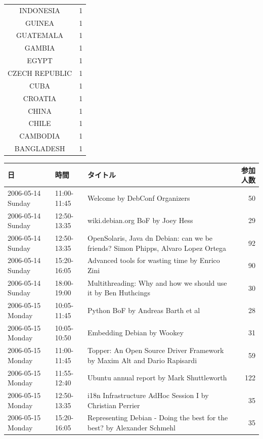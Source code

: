 \documentclass[mingoth,a4paper]{jsarticle}
\begin{document}
\begin{minipage}[t]{0.3\hsize}
{\begin{center}
\begin{tabular}[t]{@{\vrule width 1pt}c|r@{\ \vrule width 1pt}}
 INDONESIA & 1 \\
 GUINEA & 1 \\
 GUATEMALA & 1 \\
 GAMBIA & 1 \\
 EGYPT & 1 \\
 CZECH REPUBLIC & 1 \\
 CUBA & 1 \\
 CROATIA & 1 \\
 CHINA & 1 \\
 CHILE & 1 \\
 CAMBODIA & 1 \\
 BANGLADESH & 1 \\
\hline
 \end{tabular}
\end{center} 
}
\end{minipage}
\begin{minipage}[t]{0.7\hsize}
 \begin{center}
 {\scriptsize
 \begin{tabular}{|l|l|p{20em}|r|}
\hline
日 & 時間 & タイトル & 参加人数 \\
\hline
 2006-05-14 Sunday & 11:00-11:45 & Welcome by DebConf Organizers &  50 \\
 2006-05-14 Sunday & 12:50-13:35 & wiki.debian.org BoF by Joey Hess &  29 \\
 2006-05-14 Sunday & 12:50-13:35 & OpenSolaris, Java dn Debian:  can we be friends? Simon Phipps, Alvaro Lopez Ortega &  92 \\
 2006-05-14 Sunday & 15:20-16:05 & Advanced tools for wasting time by Enrico Zini &  90 \\
 2006-05-14 Sunday & 18:00-19:00 & Multithreading:  Why and how we should use it by Ben Huthcings &  30 \\
 2006-05-15 Monday & 10:05-11:45 & Python BoF by Andreas Barth et al &  28 \\
 2006-05-15 Monday & 10:05-10:50 & Embedding Debian by Wookey &  31 \\
 2006-05-15 Monday & 11:00-11:45 & Topper: An Open Source Driver Framework by Maxim Alt and Dario Rapisardi &  59 \\
 2006-05-15 Monday & 11:55-12:40 & Ubuntu annual report by Mark Shuttleworth &  122 \\
 2006-05-15 Monday & 12:50-13:35 & i18n Infrastructure AdHoc Session I by Christian Perrier &  ~35 \\
 2006-05-15 Monday & 15:20-16:05 & Representing Debian - Doing the best for the best? by Alexander Schmehl &  ~35 \\

\end{tabular}}
\end{center}
\end{minipage}
\end{document}
